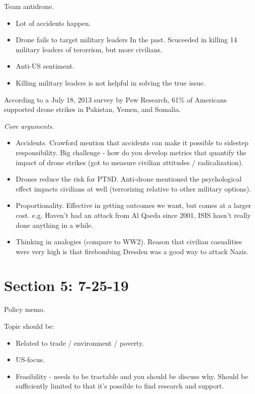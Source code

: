 \documentclass{article}
\begin{document}
Team antidrone.

\begin{itemize}
  \item Lot of accidents happen.
  \item Drone fails to target military leaders In the past.  Scuceeded in killing 14 military leaders of terorrism, but more civilians.
  \item Anti-US sentiment.
  \item Killing military leaders is not helpful in solving the true issue.
\end{itemize}


According to a July 18, 2013 survey by Pew Research, 61\% of Americans supported drone strikes in Pakistan, Yemen, and Somalia.

{\it Core arguments.}

\begin{itemize}
  \item Accidents.  Crawford mention that accidents can make it possible to sidestep responsibility.  Big challenge - how do you develop metrics that quantify the impact of drone strikes (got to measure civilian attitudes / radicalization).
  \item Drones reduce the risk for PTSD.  Anti-drone mentioned the psychological effect impacts civilians at well (terrorizing relative to other military options).
  \item Proportionality. Effective in getting outcomes we want, but comes at a larger cost.  e.g. Haven't had an attack from Al Qaeda since 2001, ISIS hasn't really done anything in a while.
  \item Thinking in analogies (compare to WW2).  Reason that civilian casualities were very high is that firebombing Dresden was a good way to attack Nazis.
\end{itemize}

\section{Section 5: 7-25-19}

Policy memo.

Topic should be:

\begin{itemize}
  \item Related to trade / environment / poverty.
  \item US-focus.
  \item Feasibility - needs to be tractable and you should be discuss why.  Should be sufficiently limited to that it's possible to find research and support.
\end{itemize}
\end{document}
